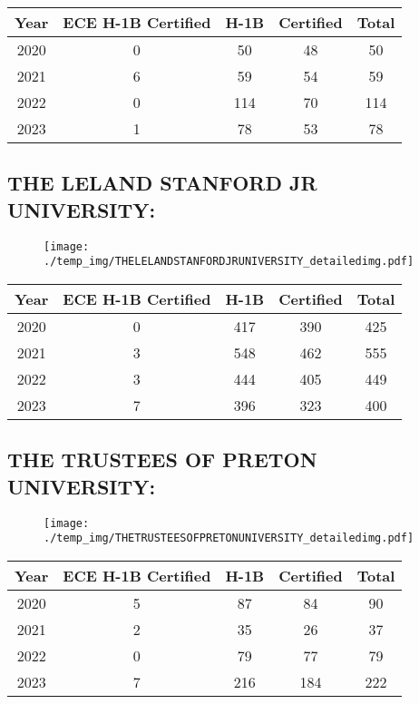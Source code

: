 \documentclass{article}%
\begin{document}
%
\begin{longtable}{c|c|c|c|c}%
\hline%
Year&ECE H{-}1B Certified&H{-}1B&Certified&Total\\%
\hline%
2020&0&50&48&50\\%
\hline%
2021&6&59&54&59\\%
\hline%
2022&0&114&70&114\\%
\hline%
2023&1&78&53&78\\%
\hline%
\end{longtable}

%
\newpage%
\subsection{THE LELAND STANFORD JR UNIVERSITY:}%
\label{subsec:THELELANDSTANFORDJRUNIVERSITY}%
\label{THELELANDSTANFORDJRUNIVERSITYdetailed}%


\begin{figure}[htbp]%
\centering%
\texttt{[image: ./temp\_img/THELELANDSTANFORDJRUNIVERSITY\_detailedimg.pdf]}%
\end{figure}

%
\begin{longtable}{c|c|c|c|c}%
\hline%
Year&ECE H{-}1B Certified&H{-}1B&Certified&Total\\%
\hline%
2020&0&417&390&425\\%
\hline%
2021&3&548&462&555\\%
\hline%
2022&3&444&405&449\\%
\hline%
2023&7&396&323&400\\%
\hline%
\end{longtable}

%
\newpage%
\subsection{THE TRUSTEES OF PRETON UNIVERSITY:}%
\label{subsec:THETRUSTEESOFPRETONUNIVERSITY}%
\label{THETRUSTEESOFPRETONUNIVERSITYdetailed}%


\begin{figure}[htbp]%
\centering%
\texttt{[image: ./temp\_img/THETRUSTEESOFPRETONUNIVERSITY\_detailedimg.pdf]}%
\end{figure}

%
\begin{longtable}{c|c|c|c|c}%
\hline%
Year&ECE H{-}1B Certified&H{-}1B&Certified&Total\\%
\hline%
2020&5&87&84&90\\%
\hline%
2021&2&35&26&37\\%
\hline%
2022&0&79&77&79\\%
\hline%
2023&7&216&184&222\\%
\hline%
\end{longtable}
\end{document}
